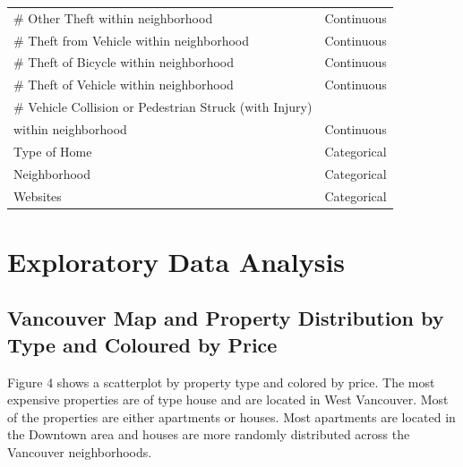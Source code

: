 \documentclass[
]{article}
\begin{document}
\begin{longtable}[]{@{}
  >{\raggedright\arraybackslash}p{}
  >{\raggedright\arraybackslash}p{}@{}}
\# Other Theft within neighborhood & Continuous \\
\# Theft from Vehicle within neighborhood & Continuous \\
\# Theft of Bicycle within neighborhood & Continuous \\
\# Theft of Vehicle within neighborhood & Continuous \\
\# Vehicle Collision or Pedestrian Struck (with Injury) & \\
within neighborhood & Continuous \\
Type of Home & Categorical \\
Neighborhood & Categorical \\
Websites & Categorical \\
\bottomrule()
\end{longtable}

\hypertarget{exploratory-data-analysis}{%
\section{Exploratory Data Analysis}\label{exploratory-data-analysis}}

\hypertarget{vancouver-map-and-property-distribution-by-type-and-coloured-by-price}{%
\subsection{Vancouver Map and Property Distribution by Type and Coloured
by
Price}\label{vancouver-map-and-property-distribution-by-type-and-coloured-by-price}}

Figure 4 shows a scatterplot by property type and colored by price. The
most expensive properties are of type house and are located in West
Vancouver. Most of the properties are either apartments or houses. Most
apartments are located in the Downtown area and houses are more randomly
distributed across the Vancouver neighborhoods.
\end{document}

